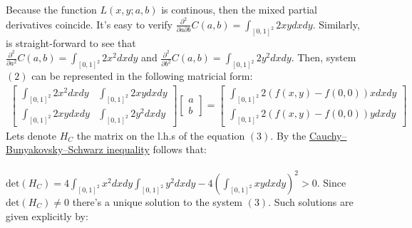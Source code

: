 \documentclass{exam}
\begin{document}
Because the function $L(x,y;a,b)$ is continous, then the mixed partial derivatives coincide. It's easy to verify $\frac{\partial^2}{\partial a \partial b} C(a,b) =  \displaystyle\int_{[0,1]^2} 2xy d x d y$. Similarly, is 
straight-forward to see that \\
$\frac{\partial^2}{\partial a^2} C(a,b) = \displaystyle\int_{[0,1]^2} 2x^2 d x d y$  and $\frac{\partial^2}{\partial b^2} C(a,b) =  \displaystyle\int_{[0,1]^2} 2y^2 d x d y$. Then, system $(2)$ can be represented in the 
following matricial form: 
\begin{equation}
        \displaystyle\begin{aligned}
        \begin{bmatrix}
            \displaystyle\int_{[0,1]^2} 2x^2 d x d y & \displaystyle\int_{[0,1]^2} 2xy d x d y\\[1.2em]
            \displaystyle\int_{[0,1]^2} 2xy d x d y & \displaystyle\int_{[0,1]^2} 2y^2 d x d y
        \end{bmatrix} 
        \begin{bmatrix}
            a\\
            b
        \end{bmatrix} 
        =
        \begin{bmatrix}
            \displaystyle\int_{[0,1]^2} 2(f(x,y) - f(0,0)) x d x d y\\[1.2em]
            \displaystyle\int_{[0,1]^2} 2(f(x,y) - f(0,0)) y d x d y
        \end{bmatrix} 
    \end{aligned}
\end{equation}
Lets denote $H_{C}$ the matrix on the l.h.s of the equation $(3)$. By the \href{https://en.wikipedia.org/wiki/Cauchy%E2%80%93Schwarz_inequality}{Cauchy–Bunyakovsky–Schwarz inequality} 
follows that:\\
\\
$\text{det}( H_{C}) = 4 \displaystyle\int_{[0,1]^2} x^2 d x d y \displaystyle\int_{[0,1]^2} y^2 d x d y  - 4 (\displaystyle\int_{[0,1]^2} xy d x d y )^2 > 0$. Since $\text{det}( H_{C}) \neq 0$ there's a unique solution to the system $(3)$. Such solutions are given explicitly by:\\
\end{document}
